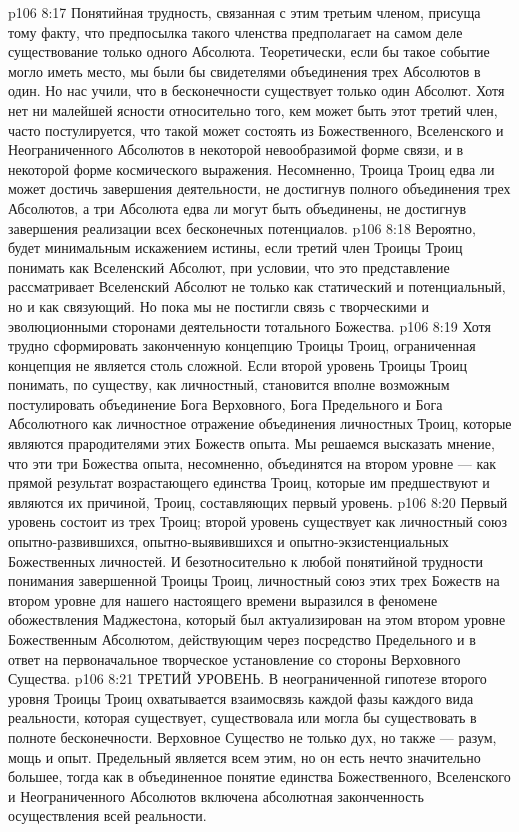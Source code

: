 \vs p106 8:17 Понятийная трудность, связанная с этим третьим членом, присуща тому факту, что предпосылка такого членства предполагает на самом деле существование только одного Абсолюта. Теоретически, если бы такое событие могло иметь место, мы были бы свидетелями  объединения трех Абсолютов в один. Но нас учили, что в бесконечности  существует только один Абсолют. Хотя нет ни малейшей ясности относительно того, кем может быть этот третий член, часто постулируется, что такой может состоять из Божественного, Вселенского и Неограниченного Абсолютов в некоторой невообразимой форме связи, и в некоторой форме космического выражения. Несомненно, Троица Троиц едва ли может достичь завершения деятельности, не достигнув полного объединения трех Абсолютов, а три Абсолюта едва ли могут быть объединены, не достигнув завершения реализации всех бесконечных потенциалов.
\vs p106 8:18 Вероятно, будет минимальным искажением истины, если третий член Троицы Троиц понимать как Вселенский Абсолют, при условии, что это представление рассматривает Вселенский Абсолют не только как статический и потенциальный, но и как связующий. Но пока мы не постигли связь с творческими и эволюционными сторонами деятельности тотального Божества.
\vs p106 8:19 Хотя трудно сформировать законченную концепцию Троицы Троиц, ограниченная концепция не является столь сложной. Если второй уровень Троицы Троиц понимать, по существу, как личностный, становится вполне возможным постулировать объединение Бога Верховного, Бога Предельного и Бога Абсолютного как личностное отражение объединения личностных Троиц, которые являются прародителями этих Божеств опыта. Мы решаемся высказать мнение, что эти три Божества опыта, несомненно, объединятся на втором уровне --- как прямой результат возрастающего единства Троиц, которые им предшествуют и являются их причиной, Троиц, составляющих первый уровень.
\vs p106 8:20 Первый уровень состоит из трех Троиц; второй уровень существует как личностный союз опытно\hyp{}развившихся, опытно\hyp{}выявившихся и опытно\hyp{}экзистенциальных Божественных личностей. И безотносительно к любой понятийной трудности понимания завершенной Троицы Троиц, личностный союз этих трех Божеств на втором уровне для нашего настоящего времени выразился в феномене обожествления Маджестона, который был актуализирован на этом втором уровне Божественным Абсолютом, действующим через посредство Предельного и в ответ на первоначальное творческое установление со стороны Верховного Существа.
\vs p106 8:21 ТРЕТИЙ УРОВЕНЬ. В неограниченной гипотезе второго уровня Троицы Троиц охватывается взаимосвязь каждой фазы каждого вида реальности, которая существует, существовала или могла бы существовать в полноте бесконечности. Верховное Существо не только дух, но также --- разум, мощь и опыт. Предельный является всем этим, но он есть нечто значительно большее, тогда как в объединенное понятие единства Божественного, Вселенского и Неограниченного Абсолютов включена абсолютная законченность осуществления всей реальности.
